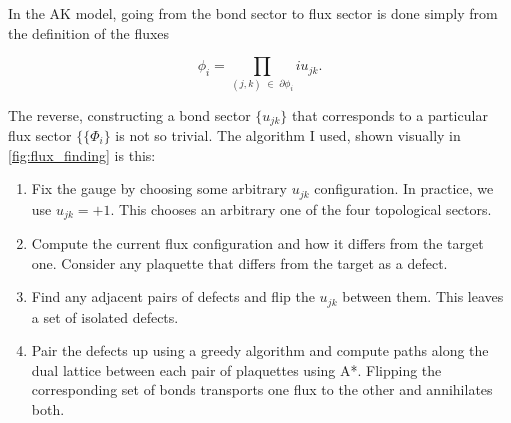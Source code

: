 In the AK model, going from the bond sector to flux sector is done simply from the definition of the fluxes

\[ \phi_i = \prod_{(j,k) \; \in \; \partial \phi_i} i u_{jk}.\]

The reverse, constructing a bond sector \(\{u_{jk}\}\) that corresponds to a particular flux sector \(\{\{\Phi_i\}\) is not so trivial. The algorithm I used, shown visually in \cref{fig:flux_finding} is this:

\begin{enumerate}
\def\labelenumi{\arabic{enumi}.}
\item
  Fix the gauge by choosing some arbitrary \(u_{jk}\) configuration. In practice, we use \(u_{jk} = +1\). This chooses an arbitrary one of the four topological sectors.
\item
  Compute the current flux configuration and how it differs from the target one. Consider any plaquette that differs from the target as a defect.
\item
  Find any adjacent pairs of defects and flip the \(u_{jk}\) between them. This leaves a set of isolated defects.
\item
  Pair the defects up using a greedy algorithm and compute paths along the dual lattice between each pair of plaquettes using A*. Flipping the corresponding set of bonds transports one flux to the other and annihilates both.
\end{enumerate}
